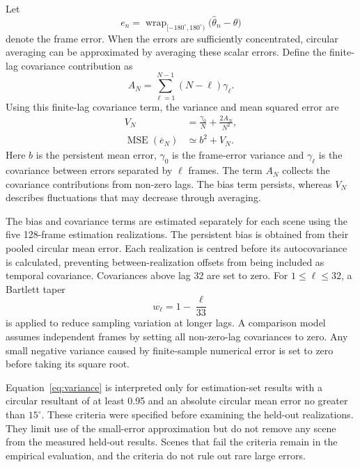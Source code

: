 \documentclass{edpsci}
\begin{document}
Let
\begin{equation}
	e_n
	=
	\operatorname{wrap}_{[-180^\circ,180^\circ)}
	\bigl(\widehat{\theta}_n-\theta\bigr)
\end{equation}
denote the frame error. When the errors are sufficiently concentrated, circular averaging can be approximated by averaging these scalar errors. Define the finite-lag covariance contribution as
\begin{equation}
	A_N
	=
	\sum_{\ell=1}^{N-1}(N-\ell)\gamma_\ell.
\end{equation}
Using this finite-lag covariance term, the variance and mean squared error are
\begin{equation}
	\begin{aligned}
		V_N
		&=
		\frac{\gamma_0}{N}
		+\frac{2A_N}{N^2},\\
		\operatorname{MSE}(\overline{e}_N)
		&\simeq b^2+V_N.
	\end{aligned}
	\label{eq:variance}
\end{equation}
Here $b$ is the persistent mean error, $\gamma_0$ is the frame-error variance and $\gamma_\ell$ is the covariance between errors separated by $\ell$ frames. The term $A_N$ collects the covariance contributions from non-zero lags. The bias term persists, whereas $V_N$ describes fluctuations that may decrease through averaging.

The bias and covariance terms are estimated separately for each scene using the five 128-frame estimation realizations. The persistent bias is obtained from their pooled circular mean error. Each realization is centred before its autocovariance is calculated, preventing between-realization offsets from being included as temporal covariance. Covariances above lag 32 are set to zero. For $1\leq\ell\leq32$, a Bartlett taper
\begin{equation}
	w_\ell=1-\frac{\ell}{33}
\end{equation}
is applied to reduce sampling variation at longer lags. A comparison model assumes independent frames by setting all non-zero-lag covariances to zero. Any small negative variance caused by finite-sample numerical error is set to zero before taking its square root.

Equation~\ref{eq:variance} is interpreted only for estimation-set results with a circular resultant of at least 0.95 and an absolute circular mean error no greater than $15^\circ$. These criteria were specified before examining the held-out realizations. They limit use of the small-error approximation but do not remove any scene from the measured held-out results. Scenes that fail the criteria remain in the empirical evaluation, and the criteria do not rule out rare large errors.
\end{document}
